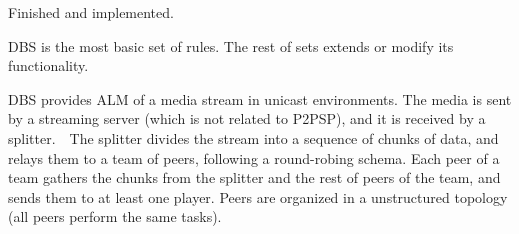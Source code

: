 
\label{sec:DBS}

\begin{notex}
  Finished and implemented.
\end{notex}

\begin{notex}
DBS is the most basic set of rules. The rest of sets extends or modify
its functionality.
\end{notex}

\acrshort{DBS} provides \acrshort{ALM} of a \gls{media} \gls{stream} in
\gls{unicast} environments. The media is sent by a streaming
\gls{server} (which is not related to P2PSP), and it is received by a
\gls{splitter}.~~The splitter divides
the stream into a sequence of \gls{chunk}s of data, and relays them to
a \gls{team} of peers, following a round-robing schema. Each peer of a
team gathers the chunks from the splitter and the rest of peers of the
team, and sends them to at least one \gls{player}. Peers are organized
in a unstructured topology (all peers perform the same tasks).

\begin{comment}
In single layered streams\footnote{Each layer of a
  scalable stream is received by a different peer attached to the same
  player capable or render scalable media.}, each peer is spawned by a
player (normal users should not run peers directly).
\end{comment}

\begin{comment}
/* quitar: We define the set of teams as
$\{T\}$,
and enumerate the peers in the team $T$ as $T=\{P_1,\cdots,P_{|T|}\}$. */
\end{comment}
